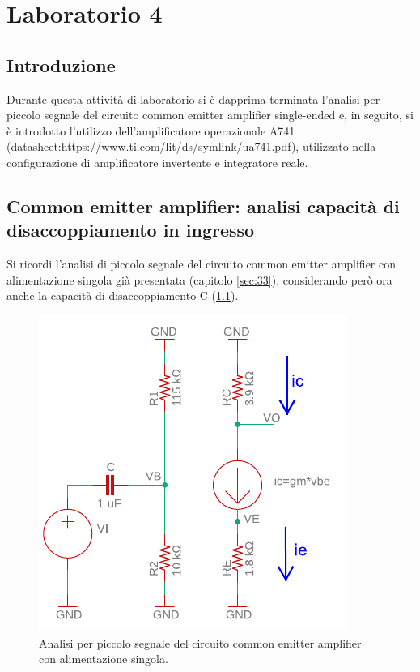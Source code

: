 \chapter{Laboratorio 4}
\section{Introduzione}
Durante questa attività di laboratorio si è dapprima terminata l'analisi per piccolo segnale del circuito common emitter amplifier single-ended e, in seguito, si è introdotto l'utilizzo dell'amplificatore operazionale \textmu A741 (datasheet:\url{https://www.ti.com/lit/ds/symlink/ua741.pdf}), utilizzato nella configurazione di amplificatore invertente e integratore reale.

\section{Common emitter amplifier: analisi capacità di disaccoppiamento in ingresso}
Si ricordi l'analisi di piccolo segnale del circuito common emitter amplifier con alimentazione singola già presentata (capitolo \ref{sec:33}), considerando però ora anche la capacità di disaccoppiamento C (\Fig\ref{fig:commonemitter_se_c_AC}).
\begin{figure}[h!]
	\centering
	\includegraphics[width=0.4\linewidth]{./OtherFiles/Laboratorio 4/common emitter_se_c-piccolo segnale-printout}
	\caption{Analisi per piccolo segnale del circuito common emitter amplifier con alimentazione singola.}
	\label{fig:commonemitter_se_c_AC}
\end{figure}

